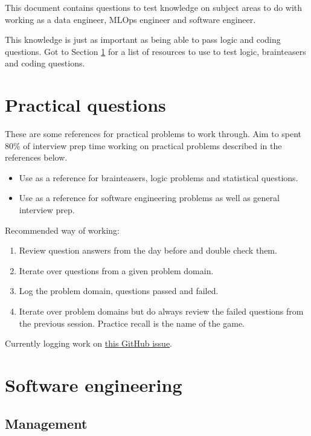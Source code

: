 This document contains questions to test knowledge on subject areas to do with working as a data engineer, MLOps engineer and software engineer.

This knowledge is just as important as being able to pass logic and coding questions. Got to Section \ref{sec:practical_problems} for a list of resources to use to test logic, brainteasers and coding questions.

\tableofcontents

\section{Practical questions} \label{sec:practical_problems}

These are some references for practical problems to work through. Aim to spent $80\%$ of interview prep time working on practical problems described in the references below.
\begin{itemize}
    \item Use \cite{hots} as a reference for brainteasers, logic problems and statistical questions.
    \item Use \cite{ctci} as a reference for software engineering problems as well as general interview prep.
\end{itemize}

Recommended way of working:
\begin{enumerate}
    \item Review question answers from the day before and double check them.
    \item Iterate over questions from a given problem domain.
    \item Log the problem domain, questions passed and failed.
    \item Iterate over problem domains but do always review the failed questions from the previous session. Practice recall is the name of the game.
\end{enumerate}

Currently logging work on \href{https://github.com/TAJD/professional/issues/4}{this GitHub issue}.

\section{Software engineering}

\subsection{Management}


